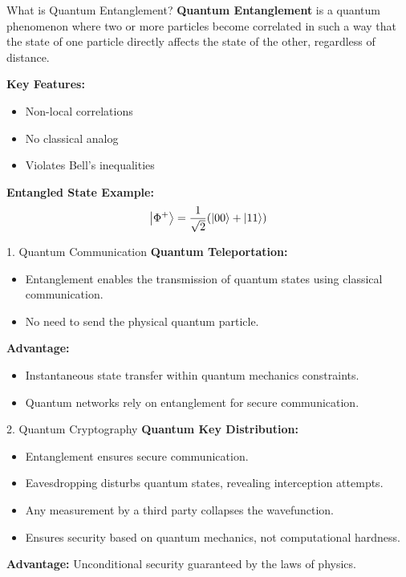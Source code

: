 \documentclass{beamer}
\begin{document}
\begin{frame}{What is Quantum Entanglement?}
\textbf{Quantum Entanglement} is a quantum phenomenon where two or more particles become correlated in such a way that the state of one particle directly affects the state of the other, regardless of distance.

\vspace{10pt}
\textbf{Key Features:}
\begin{itemize}
    \item Non-local correlations
    \item No classical analog
    \item Violates Bell's inequalities
\end{itemize}

\textbf{Entangled State Example:}
\[
\ket{\Phi^+} = \frac{1}{\sqrt{2}} (\ket{00} + \ket{11})
\]

\end{frame}


\begin{frame}{1. Quantum Communication}
\textbf{Quantum Teleportation:}
\begin{itemize}
    \item Entanglement enables the transmission of quantum states using classical communication.
    \item No need to send the physical quantum particle.
\end{itemize}

\textbf{Advantage:}
\begin{itemize}
\item Instantaneous state transfer within quantum mechanics constraints.
\item Quantum networks rely on entanglement for secure communication.
  \end{itemize}
\end{frame}

\begin{frame}{2. Quantum Cryptography}
\textbf{Quantum Key Distribution:}
\begin{itemize}
    \item Entanglement ensures secure communication.
    \item Eavesdropping disturbs quantum states, revealing interception attempts.
\end{itemize}

\begin{itemize}
\item Any measurement by a third party collapses the wavefunction.  
\item Ensures security based on quantum mechanics, not computational hardness.
\end{itemize}
\textbf{Advantage:} Unconditional security guaranteed by the laws of physics.
\end{frame}
\end{document}

